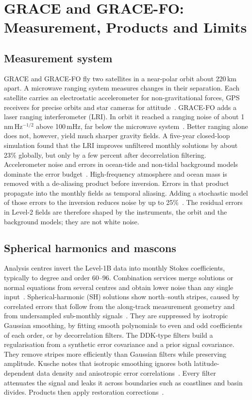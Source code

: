 \section{GRACE and GRACE-FO: Measurement, Products and Limits}
\label{sec:grace}

\subsection{Measurement system}

GRACE and GRACE-FO fly two satellites in a near-polar orbit about 220\,km apart. A microwave ranging system measures changes in their separation. Each satellite carries an electrostatic accelerometer for non-gravitational forces, GPS receivers for precise orbits and star cameras for attitude~\cite{chen2022applications}. GRACE-FO adds a laser ranging interferometer (LRI). In orbit it reached a ranging noise of about 1\,nm\,Hz$^{-1/2}$ above 100\,mHz, far below the microwave system~\cite{abich2019inorbit}. Better ranging alone does not, however, yield much sharper gravity fields. A five-year closed-loop simulation found that the LRI improves unfiltered monthly solutions by about 23\% globally, but only by a few percent after decorrelation filtering. Accelerometer noise and errors in ocean-tide and non-tidal background models dominate the error budget~\cite{flechtner2016lri}. High-frequency atmosphere and ocean mass is removed with a de-aliasing product before inversion. Errors in that product propagate into the monthly fields as temporal aliasing. Adding a stochastic model of those errors to the inversion reduces noise by up to 25\%~\cite{kvas2019background}. The residual errors in Level-2 fields are therefore shaped by the instruments, the orbit and the background models; they are not white noise.

\subsection{Spherical harmonics and mascons}

Analysis centres invert the Level-1B data into monthly Stokes coefficients, typically to degree and order 60--96. Combination services merge solutions or normal equations from several centres and obtain lower noise than any single input~\cite{jaggi2020costg}. Spherical-harmonic (SH) solutions show north--south stripes, caused by correlated errors that follow from the along-track measurement geometry and from undersampled sub-monthly signals~\cite{chen2022applications}. They are suppressed by isotropic Gaussian smoothing, by fitting smooth polynomials to even and odd coefficients of each order, or by decorrelation filters. The DDK-type filters build a regularisation from a synthetic error covariance and a prior signal covariance. They remove stripes more efficiently than Gaussian filters while preserving amplitude. Kusche notes that isotropic smoothing ignores both latitude-dependent data density and anisotropic error correlations~\cite{kusche2007approximate}. Every filter attenuates the signal and leaks it across boundaries such as coastlines and basin divides. Products then apply restoration corrections~\cite{chen2022applications}.

